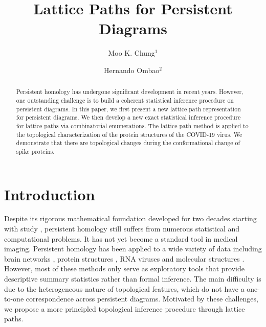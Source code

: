 \documentclass{llncs}
\begin{document}
\title{Lattice Paths for Persistent Diagrams}



\author{Moo K. Chung$^1$ \and Hernando Ombao$^2$}


\maketitle

\begin{abstract}
Persistent homology has undergone significant development in recent years. However, one outstanding challenge is to build a coherent statistical inference procedure on persistent diagrams. In this paper, we first present a new  lattice path representation for  persistent diagrams.  We then develop a new exact statistical inference procedure for lattice paths via combinatorial enumerations. The lattice path method is applied to the topological characterization of the protein structures of the COVID-19 virus. We demonstrate that there are topological changes during the conformational change of spike proteins.
\end{abstract}

\section{Introduction}
\vspace{-5pt}
Despite its rigorous mathematical foundation developed for two decades starting with study \cite{edelsbrunner.2000},  persistent homology still suffers from numerous statistical and computational problems. It has not yet become a standard tool in medical imaging. Persistent homology has been applied to a wide variety of data including brain networks \cite{chung.2019.NN}, protein structures \cite{gameiro.2015}, RNA viruses \cite{chan.2013} and molecular structures \cite{meng.2021}. However, most of these methods only serve as exploratory tools that provide descriptive summary statistics rather than formal inference. The main difficulty is due to the heterogeneous nature of topological features, which do not have a one-to-one correspondence across persistent diagrams. Motivated by these challenges, we propose a more principled  topological inference procedure through lattice paths. 
\end{document}
